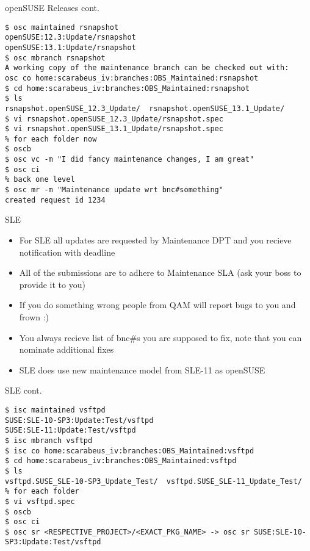 \documentclass{beamer}
\begin{document}
\begin{frame}[fragile]{openSUSE Releases cont.}
	\begin{tiny}
	\begin{verbatim}
$ osc maintained rsnapshot
openSUSE:12.3:Update/rsnapshot
openSUSE:13.1:Update/rsnapshot
$ osc mbranch rsnapshot
A working copy of the maintenance branch can be checked out with:
osc co home:scarabeus_iv:branches:OBS_Maintained:rsnapshot
$ cd home:scarabeus_iv:branches:OBS_Maintained:rsnapshot
$ ls
rsnapshot.openSUSE_12.3_Update/  rsnapshot.openSUSE_13.1_Update/
$ vi rsnapshot.openSUSE_12.3_Update/rsnapshot.spec
$ vi rsnapshot.openSUSE_13.1_Update/rsnapshot.spec
% for each folder now
$ oscb
$ osc vc -m "I did fancy maintenance changes, I am great"
$ osc ci
% back one level
$ osc mr -m "Maintenance update wrt bnc#something"
created request id 1234
	\end{verbatim}
	\end{tiny}
\end{frame}

\begin{frame}[t]{SLE}
	\begin{itemize}
	\item For SLE all updates are requested by Maintenance DPT and you recieve notification with deadline
	\item All of the submissions are to adhere to Maintenance SLA (ask your boss to provide it to you)
	\item If you do something wrong people from QAM will report bugs to you and frown :)
	\item You always recieve list of bnc\#s you are supposed to fix, note that you can nominate additional fixes
	\item SLE does use new maintenance model from SLE-11 as openSUSE
	\end{itemize}
\end{frame}

\begin{frame}[fragile]{SLE cont.}
	\begin{tiny}
	\begin{verbatim}
$ isc maintained vsftpd
SUSE:SLE-10-SP3:Update:Test/vsftpd
SUSE:SLE-11:Update:Test/vsftpd
$ isc mbranch vsftpd
$ isc co home:scarabeus_iv:branches:OBS_Maintained:vsftpd
$ cd home:scarabeus_iv:branches:OBS_Maintained:vsftpd
$ ls
vsftpd.SUSE_SLE-10-SP3_Update_Test/  vsftpd.SUSE_SLE-11_Update_Test/
% for each folder
$ vi vsftpd.spec
$ oscb
$ osc ci
$ osc sr <RESPECTIVE_PROJECT>/<EXACT_PKG_NAME> -> osc sr SUSE:SLE-10-SP3:Update:Test/vsftpd
	\end{verbatim}
	\end{tiny}
\end{frame}
\end{document}
